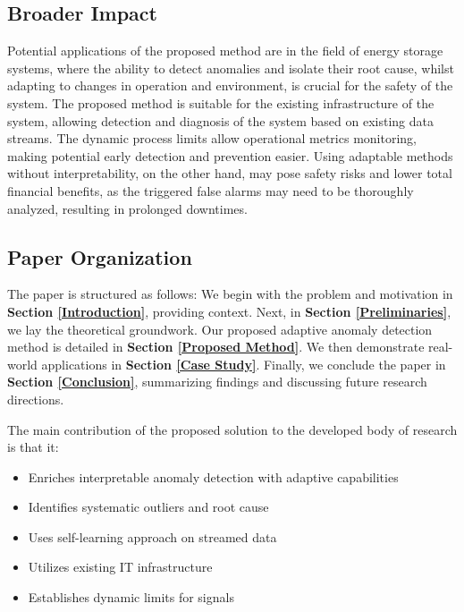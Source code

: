 \subsection{Broader Impact}
Potential applications of the proposed method are in the field of energy storage systems, where the ability to detect anomalies and isolate their root cause, whilst adapting to changes in operation and environment, is crucial for the safety of the system. The proposed method is suitable for the existing infrastructure of the system, allowing detection and diagnosis of the system based on existing data streams. The dynamic process limits allow operational metrics monitoring, making potential early detection and prevention easier. Using adaptable methods without interpretability, on the other hand, may pose safety risks and lower total financial benefits, as the triggered false alarms may need to be thoroughly analyzed, resulting in prolonged downtimes.

\subsection{Paper Organization}
The paper is structured as follows: We begin with the problem and motivation in \textbf{Section \ref{Introduction}}, providing context. Next, in \textbf{Section \ref{Preliminaries}}, we lay the theoretical groundwork. Our proposed adaptive anomaly detection method is detailed in \textbf{Section \ref{Proposed Method}}. We then demonstrate real-world applications in \textbf{Section \ref{Case Study}}. Finally, we conclude the paper in \textbf{Section \ref{Conclusion}}, summarizing findings and discussing future research directions.

The main contribution of the proposed solution to the developed body of research is that it:
\begin{itemize}
\item Enriches interpretable anomaly detection with adaptive capabilities
\item Identifies systematic outliers and root cause
\item Uses self-learning approach on streamed data
\item Utilizes existing IT infrastructure
\item Establishes dynamic limits for signals
\end{itemize}

